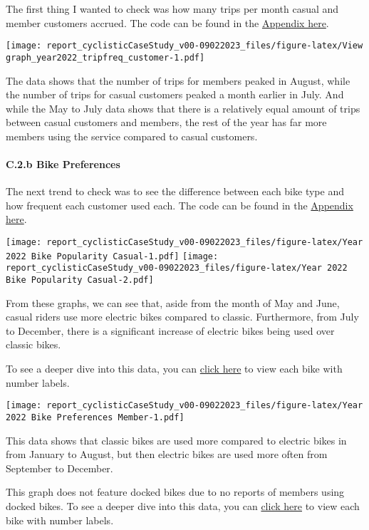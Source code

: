 \documentclass[
]{article}
\begin{document}
The first thing I wanted to check was how many trips per month casual
and member customers accrued. The code can be found in the
\protect\hyperlink{Appx3}{Appendix here}.

\texttt{[image: report\_cyclisticCaseStudy\_v00-09022023\_files/figure-latex/View graph\_year2022\_tripfreq\_customer-1.pdf]}

The data shows that the number of trips for members peaked in August,
while the number of trips for casual customers peaked a month earlier in
July. And while the May to July data shows that there is a relatively
equal amount of trips between casual customers and members, the rest of
the year has far more members using the service compared to casual
customers.

\hypertarget{c.2.b-bike-preferences}{%
\paragraph{C.2.b Bike Preferences}\label{c.2.b-bike-preferences}}

The next trend to check was to see the difference between each bike type
and how frequent each customer used each. The code can be found in the
\protect\hyperlink{Appx4}{Appendix here}.

\texttt{[image: report\_cyclisticCaseStudy\_v00-09022023\_files/figure-latex/Year 2022 Bike Popularity Casual-1.pdf]}
\texttt{[image: report\_cyclisticCaseStudy\_v00-09022023\_files/figure-latex/Year 2022 Bike Popularity Casual-2.pdf]}

From these graphs, we can see that, aside from the month of May and
June, casual riders use more electric bikes compared to classic.
Furthermore, from July to December, there is a significant increase of
electric bikes being used over classic bikes.

To see a deeper dive into this data, you can
\protect\hyperlink{MoreViz1}{click here} to view each bike with number
labels.

\texttt{[image: report\_cyclisticCaseStudy\_v00-09022023\_files/figure-latex/Year 2022 Bike Preferences Member-1.pdf]}

This data shows that classic bikes are used more compared to electric
bikes in from January to August, but then electric bikes are used more
often from September to December.

This graph does not feature docked bikes due to no reports of members
using docked bikes. To see a deeper dive into this data, you can
\protect\hyperlink{MoreViz2}{click here} to view each bike with number
labels.
\end{document}

